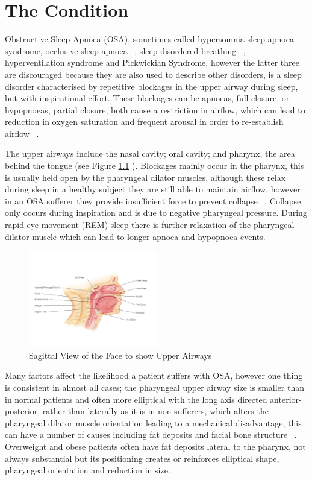 \chapter{The Condition}
\label{ch:medicalInfo}
Obstructive Sleep Apnoea (OSA), sometimes called hypersomnia sleep apnoea syndrome, occlusive sleep apnoea ~\cite{whitelaw1993characteristics}, sleep disordered breathing ~\cite{sleepdisorderedbreathing}, hyperventilation syndrome and Pickwickian Syndrome, however the latter three are discouraged because they are also used to describe other disorders, is a sleep disorder characterised by repetitive blockages in the upper airway during sleep, but with inspirational effort. These blockages can be apnoeas, full closure, or hypopnoeas, partial closure, both cause a restriction in airflow, which can lead to reduction in oxygen saturation and frequent arousal in order to re-establish airflow ~\cite{american2001international}.

The upper airways include the nasal cavity; oral cavity; and pharynx, the area behind the tongue (see Figure \ref{fig:Sagittal-Face} ). Blockages mainly occur in the pharynx, this is usually held open by the pharyngeal dilator muscles, although these relax during sleep in a healthy subject they are still able to maintain airflow, however in an OSA sufferer they provide insufficient force to prevent collapse ~\cite{fogel2004sleep}. Collapse only occurs during inspiration and is due to negative pharyngeal pressure. During rapid eye movement (REM) sleep there is further relaxation of the pharyngeal dilator muscle which can lead to longer apnoea and hypopnoea events. 

\begin{figure}[h]
\centering
\includegraphics[width=0.5\textwidth]{drawings/Sagittal-Face}
\caption{Sagittal View of the Face to show Upper Airways ~\cite{sagittalface}}
\label{fig:Sagittal-Face}
\end{figure}
Many factors affect the likelihood a patient suffers with OSA, however one thing is consistent in almost all cases; the pharyngeal upper airway size is smaller than in normal patients and often more elliptical with the long axis directed anterior-posterior, rather than laterally as it is in non sufferers, which alters the pharyngeal dilator muscle orientation leading to a mechanical disadvantage, this can have a number of causes including fat deposits and facial bone structure ~\cite{leiter1996upper}. Overweight and obese patients often have fat deposits lateral to the pharynx, not always substantial but its positioning creates or reinforces elliptical shape, pharyngeal orientation and reduction in size. 

